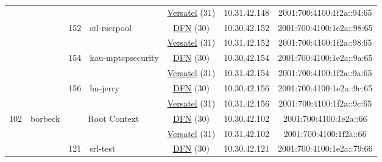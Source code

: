 \begin{small}
\begin{center}
\begin{longtable}{|c|c|c|c|c|c|c|c|}
  &  &  &  & \multicolumn{2}{|c|}{\tiny{\href{http://www.versatel.de}{Versatel} (31)}} & \tiny{10.31.42.148} & \tiny{2001:700:4100:1f2a::94:65} \\* \cline{3-3}\cline{4-4}\cline{5-5}\cline{6-6}\cline{7-7}\cline{8-8}
  &  & \multirow{2}{*}{\tiny{152}} & \multicolumn{1}{|l|}{\multirow{2}{*}{\tiny{srl-rserpool}}} & \multicolumn{2}{|c|}{\tiny{\href{https://www.dfn.de}{DFN} (30)}} & \tiny{10.30.42.152} & \tiny{2001:700:4100:1e2a::98:65} \\* \cline{5-5}\cline{6-6}\cline{7-7}\cline{8-8}
  &  &  &  & \multicolumn{2}{|c|}{\tiny{\href{http://www.versatel.de}{Versatel} (31)}} & \tiny{10.31.42.152} & \tiny{2001:700:4100:1f2a::98:65} \\* \cline{3-3}\cline{4-4}\cline{5-5}\cline{6-6}\cline{7-7}\cline{8-8}
  &  & \multirow{2}{*}{\tiny{154}} & \multicolumn{1}{|l|}{\multirow{2}{*}{\tiny{kau-mptcpsecurity}}} & \multicolumn{2}{|c|}{\tiny{\href{https://www.dfn.de}{DFN} (30)}} & \tiny{10.30.42.154} & \tiny{2001:700:4100:1e2a::9a:65} \\* \cline{5-5}\cline{6-6}\cline{7-7}\cline{8-8}
  &  &  &  & \multicolumn{2}{|c|}{\tiny{\href{http://www.versatel.de}{Versatel} (31)}} & \tiny{10.31.42.154} & \tiny{2001:700:4100:1f2a::9a:65} \\* \cline{3-3}\cline{4-4}\cline{5-5}\cline{6-6}\cline{7-7}\cline{8-8}
  &  & \multirow{2}{*}{\tiny{156}} & \multicolumn{1}{|l|}{\multirow{2}{*}{\tiny{hu-jerry}}} & \multicolumn{2}{|c|}{\tiny{\href{https://www.dfn.de}{DFN} (30)}} & \tiny{10.30.42.156} & \tiny{2001:700:4100:1e2a::9c:65} \\* \cline{5-5}\cline{6-6}\cline{7-7}\cline{8-8}
  &  &  &  & \multicolumn{2}{|c|}{\tiny{\href{http://www.versatel.de}{Versatel} (31)}} & \tiny{10.31.42.156} & \tiny{2001:700:4100:1f2a::9c:65} \\ \hline
 \multirow{20}{*}{\tiny{102}} & \multicolumn{1}{|l|}{\multirow{20}{*}{\tiny{borbeck}}} & \multicolumn{2}{|c|}{\multirow{2}{*}{\tiny{Root Context}}} & \multicolumn{2}{|c|}{\tiny{\href{https://www.dfn.de}{DFN} (30)}} & \tiny{10.30.42.102} & \tiny{2001:700:4100:1e2a::66} \\* \cline{5-5}\cline{6-6}\cline{7-7}\cline{8-8}
  &  & \multicolumn{2}{|c|}{} & \multicolumn{2}{|c|}{\tiny{\href{http://www.versatel.de}{Versatel} (31)}} & \tiny{10.31.42.102} & \tiny{2001:700:4100:1f2a::66} \\* \cline{3-3}\cline{4-4}\cline{5-5}\cline{6-6}\cline{7-7}\cline{8-8}
  &  & \multirow{2}{*}{\tiny{121}} & \multicolumn{1}{|l|}{\multirow{2}{*}{\tiny{srl-test}}} & \multicolumn{2}{|c|}{\tiny{\href{https://www.dfn.de}{DFN} (30)}} & \tiny{10.30.42.121} & \tiny{2001:700:4100:1e2a::79:66} \\* \cline{5-5}\cline{6-6}\cline{7-7}\cline{8-8}

\end{longtable}
\end{center}
\end{small}

